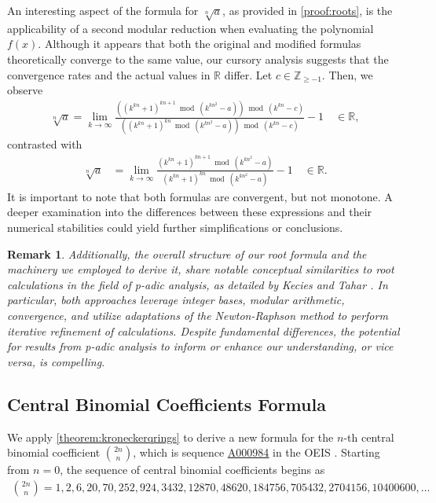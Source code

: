\documentclass[12pt]{article}
\theoremstyle{plain}
\newtheorem{remark}{Remark}
\theoremstyle{definition}
\newcommand{\seqnum}[1]{\href{https://oeis.org/#1}{\rm \underline{#1}}}
\begin{document}
An interesting aspect of the formula for $\sqrt[n]{a}$, as provided in \cref{proof:roots}, is the applicability of a second modular reduction when evaluating the polynomial $f(x)$. Although it appears that both the original and modified formulas theoretically converge to the same value, our cursory analysis suggests that the convergence rates and the actual values in $\mathbb{R}$ differ. Let $c \in \mathbb{Z}_{\geq -1}$. Then, we observe
\begin{align*}
\sqrt[n]{a} = \lim_{k \rightarrow \infty}
\frac{\left( (k^{kn} + 1)^{kn+1} \bmod{(k^{kn^2}-a)} \right) \bmod{(k^{kn}-c)}}
    {\left( (k^{kn} + 1)^{kn} \bmod{ (k^{kn^2}-a)} \right) \bmod{(k^{kn}-c)}} - 1  \quad \in \mathbb{R},
\end{align*}
contrasted with
\begin{align*}
\sqrt[n]{a} &= \lim_{k \rightarrow \infty}
    \frac{(k^{kn} + 1)^{kn+1} \bmod{(k^{kn^2}-a)}}
    {(k^{kn} + 1)^{kn} \bmod{ (k^{kn^2}-a)}} - 1  \quad \in \mathbb{R}.
\end{align*}
It is important to note that both formulas are convergent, but not monotone. A deeper examination into the differences between these expressions and their numerical stabilities could yield further simplifications or conclusions.

\begin{remark}
Additionally, the overall structure of our root formula and the machinery we employed to derive it, share notable conceptual similarities to root calculations in the field of p-adic analysis, as detailed by Kecies and Tahar \cite{kecies2013padic}. In particular, both approaches leverage integer bases, modular arithmetic, convergence, and utilize adaptations of the Newton-Raphson method to perform iterative refinement of calculations. Despite fundamental differences, the potential for results from p-adic analysis to inform or enhance our understanding, or vice versa, is compelling.
\end{remark}

\subsection{Central Binomial Coefficients Formula}
We apply \cref{theorem:kroneckerqrings} to derive a new formula for the $n$-th central binomial coefficient $\binom{2n}{n}$, which is sequence \seqnum{A000984} in the OEIS \cite{A000984}. Starting from $n=0$, the sequence of central binomial coefficients begins as
\begin{align*}
    \binom{2n}{n} = 1, 2, 6, 20, 70, 252, 924, 3432, 12870, 48620, 184756, 705432, 2704156, 10400600, \ldots
\end{align*}
\end{document}
